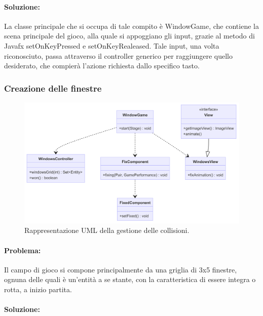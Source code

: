 \paragraph{Soluzione:}
La classe principale che si occupa di tale compito è WindowGame, che contiene la scena principale del gioco, alla quale si appoggiano gli input, grazie al metodo di Javafx setOnKeyPressed e setOnKeyRealeased.
Tale input, una volta riconosciuto, passa attraverso il controller generico per raggiungere quello desiderato, che compierà l'azione richiesta dallo specifico tasto.

\subsubsection{Creazione delle finestre}

\begin{figure}[H]
\centering{}
\includegraphics[width=\textwidth]{img/windows.png}
\caption{Rappresentazione UML della gestione delle collisioni.}
\end{figure}

\paragraph{Problema:}
Il campo di gioco si compone principalmente da una griglia di 3x5 finestre, ognuna delle quali è un'entità a se stante, con la caratteristica di essere integra o rotta, a inizio partita.

\paragraph{Soluzione:}

